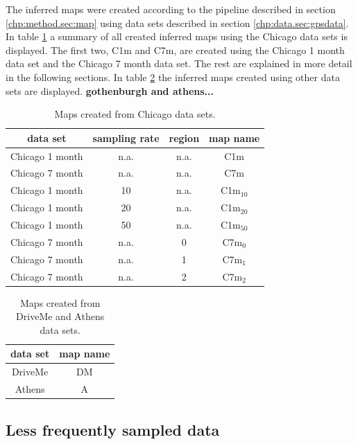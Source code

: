The inferred maps were created according to the pipeline described in section \ref{chp:method.sec:map} using data sets described in section \ref{chp:data.sec:gpsdata}. In table \ref{tab:mapgen_exp_setup:chicago_maps} a summary of all created inferred maps using the Chicago data sets is displayed. The first two, C1m and C7m, are created using the Chicago 1 month data set and the Chicago 7 month data set. The rest are explained in more detail in the following sections. In table \ref{tab:mapgen_exp_setup:other_maps} the inferred maps created using other data sets are displayed. \textbf{gothenburgh and athens...}

\begin{table}[H]
\centering
\caption{Maps created from Chicago data sets.}
\label{tab:mapgen_exp_setup:chicago_maps}
\begin{tabular}{cccc}
data set        & sampling rate & region & map name                \\ \hline
Chicago 1 month & n.a.        & n.a.   & C1m                     \\
Chicago 7 month & n.a.        & n.a.   & C7m                     \\
Chicago 1 month & 10          & n.a.   & C1m$_{10}$ \\ 
Chicago 1 month & 20          & n.a.   & C1m$_{20}$ \\ 
Chicago 1 month & 50          & n.a.   & C1m$_{50}$ \\
Chicago 7 month & n.a.        & 0      & C7m$_0$  \\
Chicago 7 month & n.a.        & 1      & C7m$_1$  \\
Chicago 7 month & n.a.        & 2      & C7m$_2$  \\ \hline
\end{tabular}
\end{table}

\begin{table}[H]
\centering
\caption{Maps created from DriveMe and Athens data sets.}
\label{tab:mapgen_exp_setup:other_maps}
\begin{tabular}{cc}
data set & map name     \\ \hline
DriveMe  & DM           \\
Athens   & A            \\ \hline
\end{tabular}
\end{table}


\subsection{Less frequently sampled data}

